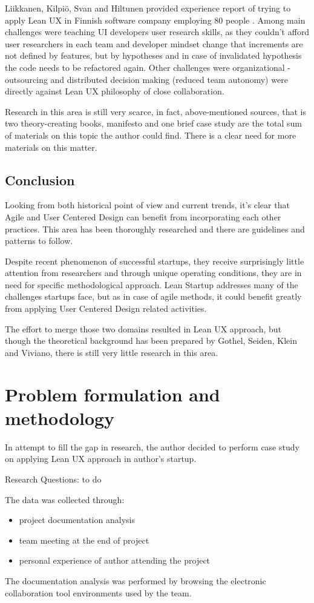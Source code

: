 \documentclass{article}
\begin{document}
Liikkanen, Kilpiö, Svan and Hiltunen provided experience report of trying to apply Lean UX in Finnish software company employing 80 people \cite{liikkanen2014lean}. Among main challenges were teaching UI developers user research skills, as they couldn't afford user researchers in each team and developer mindset change that increments are not defined by features, but by hypotheses and in case of invalidated hypothesis the code needs to be refactored again. Other challenges were organizational - outsourcing and distributed decision making (reduced team autonomy) were directly against Lean UX philosophy of close collaboration.

Research in this area is still very scarce, in fact, above-mentioned sources, that is two theory-creating books, manifesto and one brief case study are the total sum of materials on this topic the author could find. There is a clear need for more materials on this matter.

\subsection{Conclusion}
Looking from both historical point of view and current trends, it's clear that Agile and User Centered Design can benefit from incorporating each other practices. This area has been thoroughly researched and there are guidelines and patterns to follow.

Despite recent phenomenon of successful startups, they receive surprisingly little attention from researchers and through unique operating conditions, they are in need for specific methodological approach. Lean Startup addresses many of the challenges startups face, but as in case of agile methods, it could benefit greatly from applying User Centered Design related activities.

The effort to merge those two domains resulted in Lean UX approach, but though the theoretical background has been prepared by Gothel, Seiden, Klein and Viviano, there is still very little research in this area.

\section{Problem formulation and methodology}
In attempt to fill the gap in research, the author decided to perform case study on applying Lean UX approach in author's startup.

Research Questions: to do

The data was collected through:
\begin{itemize}
  \item project documentation analysis
  \item team meeting at the end of project 
  \item personal experience of author attending the project 
\end{itemize}
The documentation analysis was performed by browsing the electronic collaboration tool environments used by the team.
\end{document}
